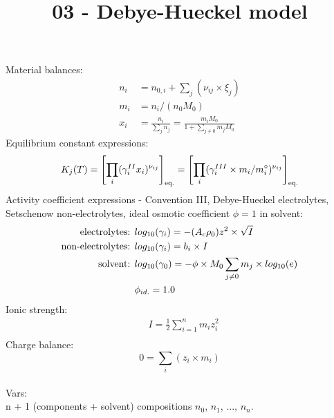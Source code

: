 \documentclass[onecolumn]{article}
\begin{document}
\title{03 - Debye-Hueckel model}
\author{}
\date{}
\maketitle
Material balances:
\begin{equation}
\begin{aligned}
\label{eq:mole_balance}
n_i &= n_{0,i} + \sum_j(\nu_{ij} \times \xi_j) \\
m_i &= n_i /(n_0 M_0) \\
x_i &= \frac{n_i}{\sum_j{n_j}}= \frac{m_i M_0}{1+\sum_{j\neq0}{m_j M_0}}
\end{aligned}
\end{equation}
Equilibrium constant expressions:
\begin{equation}
\label{eq:eq_expr}
K_j(T) = \left[ \prod_i(\gamma^{II}_i x_i)^{\nu_{ij}} \right]_{\textnormal{eq.}} =
\left[ \prod_i(\gamma^{III}_i \times m_i/m^{\circ}_i )^{\nu_{ij}} \right]_{\textnormal{eq.}}
\end{equation}
Activity coefficient expressions - Convention III, Debye-Hueckel electrolytes,
Setschenow non-electrolytes, ideal osmotic coefficient $\phi=1$ in solvent:
\begin{equation}
\label{eq:activity_coeff}
\begin{aligned}
\textnormal{electrolytes: } & log_{10}(\gamma_{i}) = -(A_c \rho_0) z^2  \times \sqrt{I} \\
\textnormal{non-electrolytes: } & log_{10}(\gamma_{i}) = b_i \times I \\
\textnormal{solvent: } & log_{10}(\gamma_{0}) =
-\phi \times M_0 \sum_{j\neq0}{m_j} \times log_{10}(e)\\
 & \phi_{id.} =   1.0 \\
\end{aligned}
\end{equation}
Ionic strength:
\begin{equation}
\label{eq:ionic_strength}
\begin{aligned}
& I = \frac{1}{2} \sum_{i=1}^n m_i z_i^2 \\
\end{aligned}
\end{equation}
Charge balance:
\begin{equation}
0 = \sum_i(z_i \times m_i)
\end{equation}
\\
Vars: \\
n + 1 (components + solvent) compositions $n_0$, $n_1$, ..., $n_n$. \\
\end{document}
